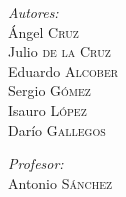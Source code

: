 \documentclass[12pt]{article}
\begin{document}
\begin{titlepage}

\begin{minipage}{0.4\textwidth}
\begin{flushleft} \large
\emph{Autores:}\\
Ángel \textsc{Cruz} \\ %
Julio \textsc{de la Cruz} \\
Eduardo \textsc{Alcober}\\
Sergio \textsc{Gómez}\\
Isauro \textsc{López}\\
Darío \textsc{Gallegos}
\end{flushleft}
\end{minipage}
\begin{minipage}{0.4\textwidth}
\begin{flushright} \large
\emph{Profesor:} \\
Antonio \textsc{Sánchez} %
\end{flushright}
\end{minipage}\\[0.66cm]


\vfill %

\end{titlepage}



\tableofcontents %
\newpage
\end{document}
